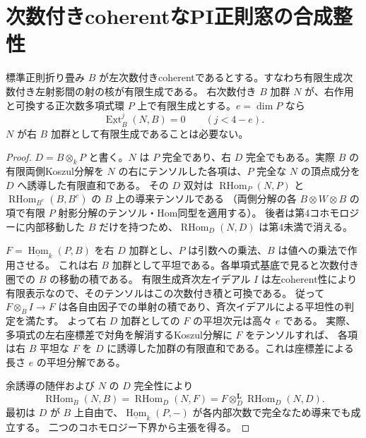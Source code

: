 \section{次数付きcoherentなPI正則窓の合成整性}
\label{sec:coherent-pi-regular-domains}
\begin{lemma}\label{lem:coherent-external-growth-grade}
標準正則折り畳み $B$ が左次数付きcoherentであるとする。すなわち有限生成次数付き左射影間の射の核が有限生成である。
右次数付き $B$ 加群 $N$ が、右作用と可換する正次数多項式環 $P$ 上で有限生成とする。$e=\dim P$ なら
\[
                \underline{\operatorname{Ext}}^j_B(N,B)=0\qquad(j<4-e).
\]
$N$ が右 $B$ 加群として有限生成であることは必要ない。
\end{lemma}
\begin{proof}
$D=B\otimes_k P$ と書く。$N$ は $P$ 完全であり、右 $D$ 完全でもある。実際 $B$ の有限両側Koszul分解を
$N$ の右にテンソルした各項は、$P$ 完全な $N$ の頂点成分を $D$ へ誘導した有限直和である。
その $D$ 双対は $\operatorname{RHom}_P(N,P)$ と $\operatorname{RHom}_{B^e}(B,B^e)$ の $B$ 上の導来テンソルである
（両側分解の各 $B\otimes W\otimes B$ の項で有限 $P$ 射影分解のテンソル・Hom同型を適用する）。
後者は第4コホモロジーに内部移動した $B$ だけを持つため、$\operatorname{RHom}_D(N,D)$ は第4未満で消える。

$F=\underline{\operatorname{Hom}}_k(P,B)$ を右 $D$ 加群とし、$P$ は引数への乗法、$B$ は値への乗法で作用させる。
これは右 $B$ 加群として平坦である。各単項式基底で見ると次数付き圏での $B$ の移動の積である。
有限生成斉次左イデアル $I$ は左coherent性により有限表示なので、そのテンソルはこの次数付き積と可換である。
従って $F\otimes_B I\to F$ は各自由因子での単射の積であり、斉次イデアルによる平坦性の判定を満たす。
よって右 $D$ 加群としての $F$ の平坦次元は高々 $e$ である。
実際、多項式の左右座標差で対角を解消するKoszul分解に $F$ をテンソルすれば、
各項は右 $B$ 平坦な $F$ を $D$ に誘導した加群の有限直和である。これは座標差による長さ $e$ の平坦分解である。

余誘導の随伴および $N$ の $D$ 完全性により
\[
 \operatorname{RHom}_B(N,B)=\operatorname{RHom}_D(N,F)
     = F\otimes_D^{\mathbf L}\operatorname{RHom}_D(N,D).
\]
最初は $D$ が $B$ 上自由で、$\underline{\operatorname{Hom}}_k(P,-)$ が各内部次数で完全なため導来でも成立する。
二つのコホモロジー下界から主張を得る。
\end{proof}

